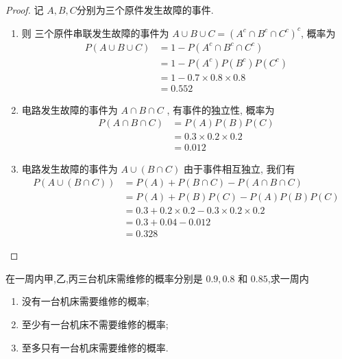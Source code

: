 \documentclass[../main.tex]{subfiles}
\begin{document}
\begin{proof}
    记 \(  A,B,C  \)分别为三个原件发生故障的事件. 
    \begin{enumerate}
        \item 则 三个原件串联发生故障的事件为 \(  A\cup B\cup C= \left( A^{c}\cap B^{c}\cap C^{c} \right)^{c}   \), 概率为 \[
        \begin{aligned}
        P\left( A\cup B\cup C \right)&=  1-P\left( A^{c}\cap B^{c}\cap C^{c} \right)\\ 
         &= 1-P\left( A^{c} \right)P\left( B^{c} \right)P\left( C^{c} \right)\\ 
          &= 1- 0.7\times 0.8 \times 0.8\\ 
           &= 0.552      
        \end{aligned}
        \] 
        \item 电路发生故障的事件为 \(  A\cap B\cap C  \) , 有事件的独立性, 概率为 \[
        \begin{aligned}
        P\left( A\cap B\cap C \right)&= P\left( A \right)P\left( B \right)P\left( C \right)\\ 
         &= 0.3\times 0.2\times 0.2\\ 
          &= 0.012     
        \end{aligned}
        \]
        \item 电路发生故障的事件为 \(  A\cup \left( B\cap C \right)   \) 由于事件相互独立, 我们有 \[
        \begin{aligned}
        P\left( A\cup \left( B\cap C \right)  \right)&= P\left( A \right)+ P\left( B\cap C \right)-P\left( A\cap B\cap C \right)   \\ 
         &= P\left( A \right)+ P\left( B \right)P\left( C \right)-P\left( A \right)P\left( B \right)P\left( C \right)\\ 
          &= 0.3+ 0.2\times  0.2 - 0.3 \times  0.2 \times  0.2\\ 
           &= 0.3+ 0.04-0.012       \\ 
            &=  0.328 
        \end{aligned}
        \]
    \end{enumerate}
      
\end{proof}
\begin{exercise}{}{}
在一周内甲,乙,丙三台机床需维修的概率分别是 $0.9,0.8$ 和 $0.85$,求一周内
\begin{enumerate}
    \item 没有一台机床需要维修的概率;
    \item 至少有一台机床不需要维修的概率;
    \item 至多只有一台机床需要维修的概率.
\end{enumerate}
\end{exercise}
\end{document}

